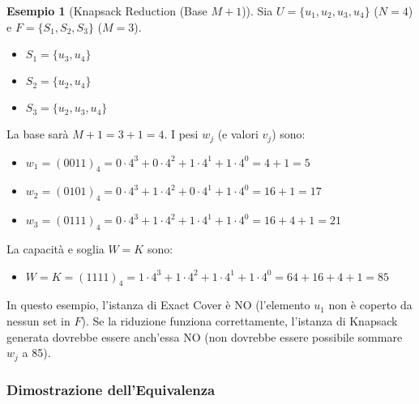 \documentclass[a4paper]{article}
\theoremstyle{definition} %
\newtheorem{example}{Esempio}
\begin{document}
\begin{example}[Knapsack Reduction (Base $M+1$)]
Sia $U = \{u_1, u_2, u_3, u_4\}$ ($N=4$) e $F = \{S_1, S_2, S_3\}$ ($M=3$).
\begin{itemize}
    \item $S_1 = \{u_3, u_4\}$
    \item $S_2 = \{u_2, u_4\}$
    \item $S_3 = \{u_2, u_3, u_4\}$
\end{itemize}
La base sarà $M+1 = 3+1 = 4$.
I pesi $w_j$ (e valori $v_j$) sono:
\begin{itemize}
    \item $w_1 = (0011)_4 = 0 \cdot 4^3 + 0 \cdot 4^2 + 1 \cdot 4^1 + 1 \cdot 4^0 = 4+1 = 5$
    \item $w_2 = (0101)_4 = 0 \cdot 4^3 + 1 \cdot 4^2 + 0 \cdot 4^1 + 1 \cdot 4^0 = 16+1 = 17$
    \item $w_3 = (0111)_4 = 0 \cdot 4^3 + 1 \cdot 4^2 + 1 \cdot 4^1 + 1 \cdot 4^0 = 16+4+1 = 21$
\end{itemize}
La capacità e soglia $W=K$ sono:
\begin{itemize}
    \item $W = K = (1111)_4 = 1 \cdot 4^3 + 1 \cdot 4^2 + 1 \cdot 4^1 + 1 \cdot 4^0 = 64+16+4+1 = 85$
\end{itemize}
In questo esempio, l'istanza di Exact Cover è NO (l'elemento $u_1$ non è coperto da nessun set in $F$). Se la riduzione funziona correttamente, l'istanza di Knapsack generata dovrebbe essere anch'essa NO (non dovrebbe essere possibile sommare $w_j$ a 85).
\end{example}

\subsubsection{Dimostrazione dell'Equivalenza}
\end{document}
